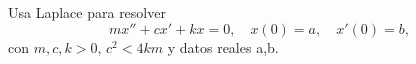 Usa Laplace para resolver
\[mx''+cx'+kx=0,\quad x(0)=a,\quad x'(0)=b,\]
con \(m,c,k>0\), \(c^2<4km\) y datos reales a,b.
